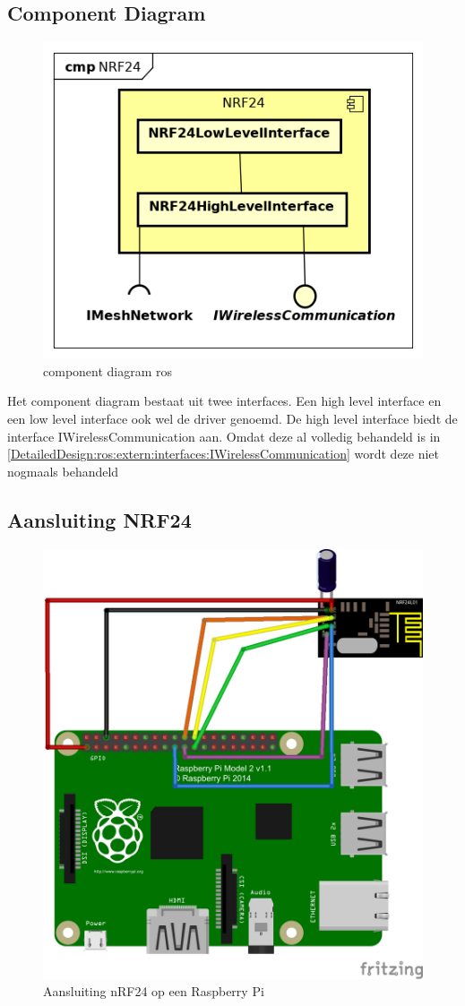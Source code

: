 \documentclass[a4paper, 11pt, oneside]{report}
\begin{document}
\subsection{Component Diagram}
\label{DetailedDesign:NRF24:ComponentDiagram}
\begin{figure}[H]
	\begin{center}\includegraphics[width=.5\linewidth]{Afbeeldingen/NRF24ComponentDiagram.png}\end{center}
	\caption{component diagram ros}
	\label{fig:component:NRF24}
\end{figure}

Het component diagram bestaat uit twee interfaces. Een high level interface en een low level interface ook wel de driver genoemd.
De high level interface biedt de interface IWirelessCommunication aan. Omdat deze al volledig behandeld is in \autoref{DetailedDesign:ros:extern:interfaces:IWirelessCommunication}  wordt deze niet nogmaals behandeld

\subsection{Aansluiting NRF24}

\begin{figure}[H]
	\begin{center}\includegraphics[width=.4\linewidth]{Afbeeldingen/fritzing_raspberry_nrf.png}\end{center}
	\caption{Aansluiting nRF24 op een Raspberry Pi}
	\label{fig:component:aansluting}
\end{figure}
\end{document}
